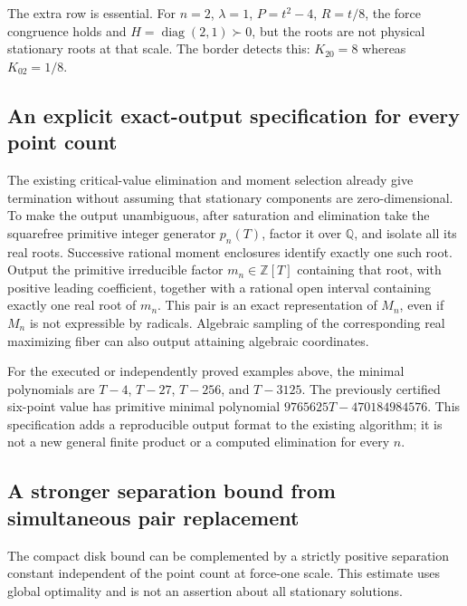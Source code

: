 \documentclass[11pt]{article}
\theoremstyle{remark}
\newcommand{\Q}{\mathbb Q}
\numberwithin{equation}{section}
\begin{document}
The extra row is essential. For $n=2$, $\lambda=1$,
$P=t^2-4$, $R=t/8$, the force congruence holds and
$H=\operatorname{diag}(2,1)\succ0$, but the roots are not
physical stationary roots at that scale. The border detects this:
$K_{20}=8$ whereas $K_{02}=1/8$.

\subsection{An explicit exact-output specification for every point count}
The existing critical-value elimination and moment selection already
give termination without assuming that stationary components are
zero-dimensional. To make the output unambiguous, after saturation
and elimination take the squarefree primitive integer generator
$p_n(T)$, factor it over $\Q$, and isolate all its real roots.
Successive rational moment enclosures identify exactly one such root.
Output the primitive irreducible factor $m_n\in\mathbb Z[T]$ containing
that root, with positive leading coefficient, together with a rational
open interval containing exactly one real root of $m_n$.
This pair is an exact representation of $M_n$, even if $M_n$ is not
expressible by radicals. Algebraic sampling of the corresponding
real maximizing fiber can also output attaining algebraic coordinates.

For the executed or independently proved examples above, the
minimal polynomials are $T-4$, $T-27$, $T-256$, and $T-3125$.
The previously certified six-point value has primitive minimal
polynomial $9765625T-470184984576$. This specification adds a
reproducible output format to the existing algorithm; it is not a
new general finite product or a computed elimination for every $n$.

\subsection{A stronger separation bound from simultaneous pair replacement}
\label{sec:pair-separation}

The compact disk bound can be complemented by a strictly positive
separation constant independent of the point count at force-one scale.
This estimate uses global optimality and is not an assertion about all
stationary solutions.
\end{document}
